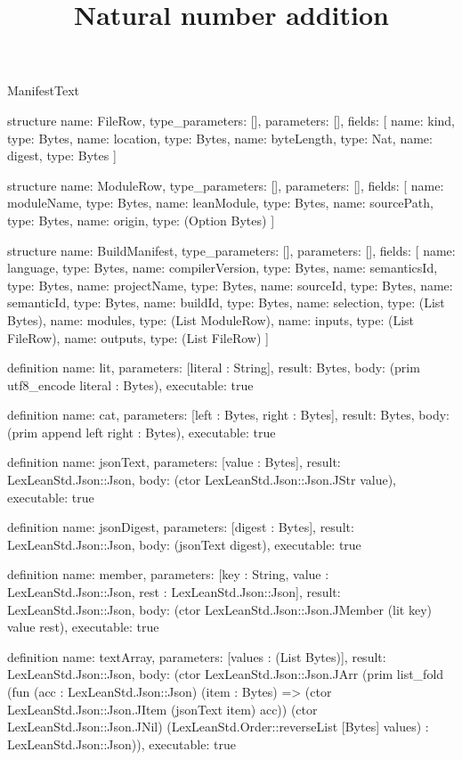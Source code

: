 \begin{lexlean}{ManifestText}
\title{Natural number addition}
\begin{semanticmodule}
structure{
  name: FileRow,
  type_parameters: [],
  parameters: [],
  fields: [
    {name: kind, type: Bytes},
    {name: location, type: Bytes},
    {name: byteLength, type: Nat},
    {name: digest, type: Bytes}
  ]
}

structure{
  name: ModuleRow,
  type_parameters: [],
  parameters: [],
  fields: [
    {name: moduleName, type: Bytes},
    {name: leanModule, type: Bytes},
    {name: sourcePath, type: Bytes},
    {name: origin, type: (Option Bytes)}
  ]
}

structure{
  name: BuildManifest,
  type_parameters: [],
  parameters: [],
  fields: [
    {name: language, type: Bytes},
    {name: compilerVersion, type: Bytes},
    {name: semanticsId, type: Bytes},
    {name: projectName, type: Bytes},
    {name: sourceId, type: Bytes},
    {name: semanticId, type: Bytes},
    {name: buildId, type: Bytes},
    {name: selection, type: (List Bytes)},
    {name: modules, type: (List ModuleRow)},
    {name: inputs, type: (List FileRow)},
    {name: outputs, type: (List FileRow)}
  ]
}

definition{
  name: lit,
  parameters: [literal : String],
  result: Bytes,
  body: (prim utf8_encode literal : Bytes),
  executable: true
}

definition{
  name: cat,
  parameters: [left : Bytes, right : Bytes],
  result: Bytes,
  body: (prim append left right : Bytes),
  executable: true
}

definition{
  name: jsonText,
  parameters: [value : Bytes],
  result: LexLeanStd.Json::Json,
  body: (ctor LexLeanStd.Json::Json.JStr value),
  executable: true
}

definition{
  name: jsonDigest,
  parameters: [digest : Bytes],
  result: LexLeanStd.Json::Json,
  body: (jsonText digest),
  executable: true
}

definition{
  name: member,
  parameters: [key : String, value : LexLeanStd.Json::Json, rest : LexLeanStd.Json::Json],
  result: LexLeanStd.Json::Json,
  body: (ctor LexLeanStd.Json::Json.JMember (lit key) value rest),
  executable: true
}

definition{
  name: textArray,
  parameters: [values : (List Bytes)],
  result: LexLeanStd.Json::Json,
  body: (ctor LexLeanStd.Json::Json.JArr (prim list_fold (fun (acc : LexLeanStd.Json::Json) (item : Bytes) => (ctor LexLeanStd.Json::Json.JItem (jsonText item) acc)) (ctor LexLeanStd.Json::Json.JNil) (LexLeanStd.Order::reverseList [Bytes] values) : LexLeanStd.Json::Json)),
  executable: true
}


\end{semanticmodule}
\end{lexlean}
